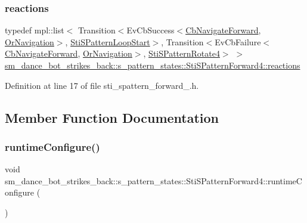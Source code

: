 \subsubsection{\texorpdfstring{reactions}{reactions}}
{\footnotesize\ttfamily typedef mpl\+::list$<$ Transition$<$Ev\+Cb\+Success$<$\hyperlink{classcl__move__base__z_1_1CbNavigateForward}{Cb\+Navigate\+Forward}, \hyperlink{classsm__dance__bot__strikes__back_1_1OrNavigation}{Or\+Navigation}$>$, \hyperlink{structsm__dance__bot__strikes__back_1_1s__pattern__states_1_1StiSPatternLoopStart}{Sti\+S\+Pattern\+Loop\+Start}$>$, Transition$<$Ev\+Cb\+Failure$<$\hyperlink{classcl__move__base__z_1_1CbNavigateForward}{Cb\+Navigate\+Forward}, \hyperlink{classsm__dance__bot__strikes__back_1_1OrNavigation}{Or\+Navigation}$>$, \hyperlink{structsm__dance__bot__strikes__back_1_1s__pattern__states_1_1StiSPatternRotate4}{Sti\+S\+Pattern\+Rotate4}$>$ $>$ \hyperlink{structsm__dance__bot__strikes__back_1_1s__pattern__states_1_1StiSPatternForward4_a9edf6136faafbfe6bb7097807cef4205}{sm\+\_\+dance\+\_\+bot\+\_\+strikes\+\_\+back\+::s\+\_\+pattern\+\_\+states\+::\+Sti\+S\+Pattern\+Forward4\+::reactions}}



Definition at line 17 of file sti\+\_\+spattern\+\_\+forward\+\_.\+h.



\subsection{Member Function Documentation}
\mbox{\label{structsm__dance__bot__strikes__back_1_1s__pattern__states_1_1StiSPatternForward4_a4701f0f01646b6ab3926751786b987f6}} 
\subsubsection{\texorpdfstring{runtime\+Configure()}{runtimeConfigure()}}
{\footnotesize\ttfamily void sm\+\_\+dance\+\_\+bot\+\_\+strikes\+\_\+back\+::s\+\_\+pattern\+\_\+states\+::\+Sti\+S\+Pattern\+Forward4\+::runtime\+Configure (\begin{DoxyParamCaption}{ }\end{DoxyParamCaption})\hspace{0.3cm}{\ttfamily [inline]}}



